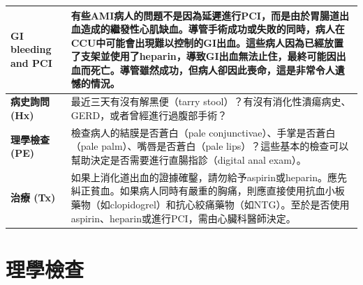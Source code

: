 \documentclass[fleqn,10pt,
paperheight=16cm, paperwidth=12cm,
includehead,%
nomarginpar,%
textwidth=10cm,%
headheight=25pt,%
]{wlscirep}
\begin{document}
\begin{longtable}{p{4cm} p{9cm}}
\textbf{GI bleeding and PCI} & 
有些AMI病人的問題不是因為延遲進行PCI，而是由於胃腸道出血造成的繼發性心肌缺血。導管手術成功或失敗的同時，病人在CCU中可能會出現難以控制的GI出血。這些病人因為已經放置了支架並使用了heparin，導致GI出血無法止住，最終可能因出血而死亡。導管雖然成功，但病人卻因此喪命，這是非常令人遺憾的情況。\\ \hline

\textbf{病史詢問 (Hx)} & 
最近三天有沒有解黑便（tarry stool）？有沒有消化性潰瘍病史、GERD，或者曾經進行過腹部手術？\\ \hline

\textbf{理學檢查 (PE)} & 
檢查病人的結膜是否蒼白（pale conjunctivae）、手掌是否蒼白（pale palm）、嘴唇是否蒼白（pale lips）？這些基本的檢查可以幫助決定是否需要進行直腸指診（digital anal exam）。\\ \hline

\textbf{治療 (Tx)} & 
如果上消化道出血的證據確鑿，請勿給予aspirin或heparin。應先糾正貧血。如果病人同時有嚴重的胸痛，則應直接使用抗血小板藥物（如clopidogrel）和抗心絞痛藥物（如NTG）。至於是否使用aspirin、heparin或進行PCI，需由心臟科醫師決定。\\ \hline

\end{longtable}

\section{理學檢查}
\end{document}
